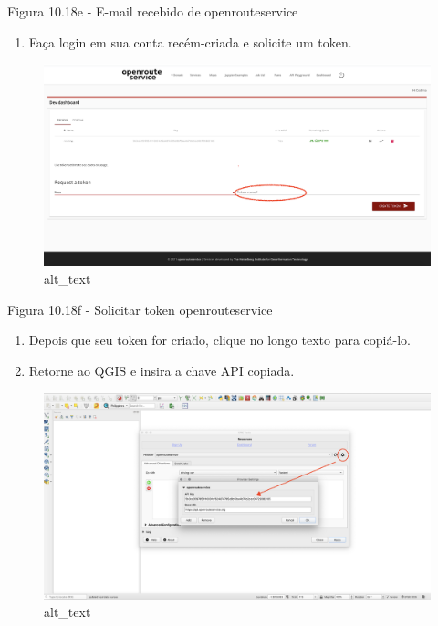 \documentclass[
  portuguese,
]{krantz}
\providecommand{\tightlist}{%
  \setlength{\itemsep}{0pt}\setlength{\parskip}{0pt}}
\begin{document}
Figura 10.18e - E-mail recebido de openrouteservice

\begin{enumerate}
\def\labelenumi{\arabic{enumi}.}
\setcounter{enumi}{3}
\tightlist
\item
  Faça login em sua conta recém-criada e solicite um token.
\end{enumerate}

\begin{figure}
\centering
\includegraphics{media/modulo10/fig1018_f.png}
\caption{alt\_text}
\end{figure}

Figura 10.18f - Solicitar token openrouteservice

\begin{enumerate}
\def\labelenumi{\arabic{enumi}.}
\setcounter{enumi}{4}
\tightlist
\item
  Depois que seu token for criado, clique no longo texto para copiá-lo.
\item
  Retorne ao QGIS e insira a chave API copiada.
\end{enumerate}

\begin{figure}
\centering
\includegraphics{media/modulo10/fig1018_g.png}
\caption{alt\_text}
\end{figure}
\end{document}
